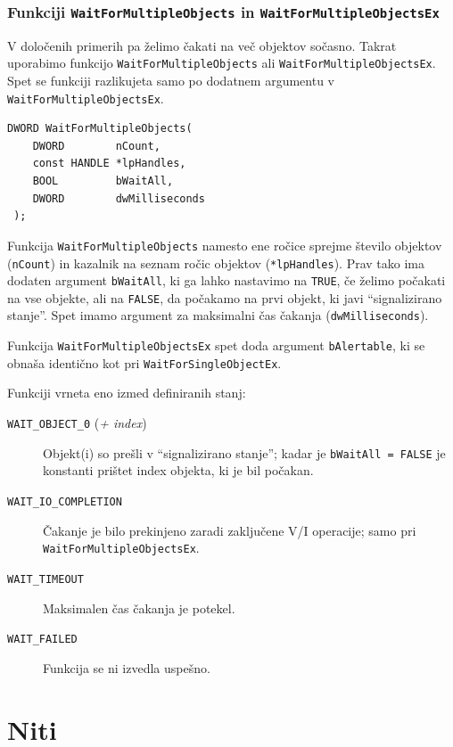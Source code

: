 \documentclass[a4paper,12pt,openright]{book}
\begin{document}
\subsubsection{Funkciji \texttt{WaitForMultipleObjects} in \texttt{WaitForMultipleObjectsEx}}

V določenih primerih pa želimo čakati na več objektov sočasno.
Takrat uporabimo funkcijo \texttt{WaitForMultipleObjects} ali \texttt{WaitForMultipleObjectsEx}.
Spet se funkciji razlikujeta samo po dodatnem argumentu v \texttt{WaitFor\-Multiple\-ObjectsEx}.

\begin{lstlisting}[style=func]
 DWORD WaitForMultipleObjects(
	DWORD        nCount,
	const HANDLE *lpHandles,
	BOOL         bWaitAll,
	DWORD        dwMilliseconds
 );
\end{lstlisting}

Funkcija \texttt{WaitForMultipleObjects} namesto ene ročice sprejme število objektov (\texttt{nCount}) in kazalnik na seznam ročic objektov (\texttt{*lpHandles}).
Prav tako ima dodaten argument \texttt{bWaitAll}, ki ga lahko nastavimo na \texttt{TRUE}, če želimo počakati na vse objekte, ali na \texttt{FALSE}, da počakamo na prvi objekt, ki javi ``signalizirano stanje''.
Spet imamo argument za maksimalni čas čakanja (\texttt{dwMilliseconds}).

Funkcija \texttt{WaitForMultipleObjectsEx} spet doda argument \texttt{bAlertable}, ki se obnaša identično kot pri \texttt{WaitForSingleObjectEx}.

Funkciji vrneta eno izmed definiranih stanj:
\begin{description}
	\item[\texttt{WAIT\_OBJECT\_0} (\textit{+ index})] Objekt(i) so prešli v ``signalizirano stanje''; kadar je \texttt{bWaitAll = FALSE} je konstanti prištet index objekta, ki je bil počakan.
	\item[\texttt{WAIT\_IO\_COMPLETION}] Čakanje je bilo prekinjeno zaradi zaključene V/I operacije; samo pri \texttt{WaitForMultipleObjectsEx}.
	\item[\texttt{WAIT\_TIMEOUT}] Maksimalen čas čakanja je potekel.
	\item[\texttt{WAIT\_FAILED}] Funkcija se ni izvedla uspešno.
\end{description}

\section{Niti} \label{sec:threads}
\end{document}
